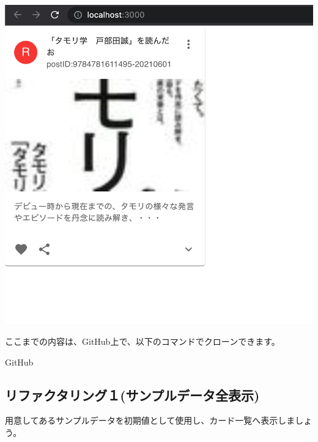 \begin{reviewimage}[H]%
\includegraphics[width=0.5\maxwidth]{./images/03-todo-with-react/sec00332-6.png}%
\label{image:03-todo-with-react:sec00332-6}
\end{reviewimage}
\begin{starternote}[]{}

ここまでの内容は、GitHub上で、以下のコマンドでクローンできます。

\def\startercodeblockfontsize{}
\begin{starterterminal}[]{GitHub}\end{starterterminal}
\end{starternote}

\subsection{リファクタリング１(サンプルデータ全表示)}
\keeplastskip{
  \label{sec:3-3-5}
  \label{sec-0333}
  \par\nobreak
}

用意してあるサンプルデータを初期値として使用し、カード一覧へ表示しましょう。


